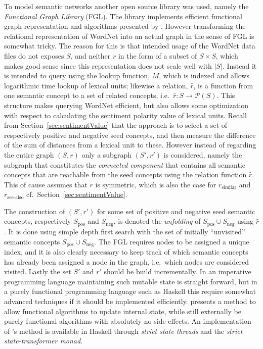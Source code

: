 To model semantic networks another open source library was used, namely the \emph{Functional Graph Library} (FGL). The library implements efficient functional graph representation and algorithms presented by \citeauthor{fgl} . However transforming the relational representation of WordNet into an actual graph in the sense of FGL is somewhat tricky. The reason for this is that intended usage of the WordNet data files do not exposes $S$, and neither $r$ in the form of a subset of $S \times S$, which makes good sense since this representation does not scale well with $|S|$. Instead it is intended to query using the lookup function, $M$, which is indexed and allows logarithmic time lookup of lexical units; likewise a relation, $\hat{r}$, is a function from one semantic concept to a set of related concepts, i.e.\ $\hat{r}: S \to \mathcal{P}(S)$. This structure makes querying WordNet efficient, but also allows some optimization with respect to calculating the sentiment polarity value of lexical units. Recall from Section~\ref{sec:sentimentValue} that the approach is to select a set of respectively positive and negative seed concepts, and then measure the difference of the sum of distances from a lexical unit to these. However instead of regarding the entire graph $(S, r)$ only a subgraph $(S', r')$ is considered, namely the subgraph that constitutes the \emph{connected component} that contains all semantic concepts that are reachable from the seed concepts using the relation function $\hat{r}$. This of cause assumes that $r$ is symmetric, which is also the case for $r_\mathrm{similar}$ and $r_\mathrm{see\text{-}also}$ cf.\ Section~\ref{sec:sentimentValue}.

The construction of $(S', r')$ for some set of positive and negative seed semantic concepts, respectively $S_\mathrm{pos}$ and $S_\mathrm{neg}$, is denoted the \emph{unfolding} of $S_\mathrm{pos} \cup S_\mathrm{neg}$ using $\hat{r}$. It is done using simple depth first search with the set of initially ``unvisited'' semantic concepts $S_\mathrm{pos} \cup S_\mathrm{neg}$. The FGL requires nodes to be assigned a unique index, and it is also clearly necessary to keep track of which semantic concepts has already been assigned a node in the graph, i.e.\ which nodes are considered visited. Lastly the set $S'$ and $r'$ should be build incrementally. In an imperative programming language maintaining such mutable state is straight forward, but in a purely functional programming language such as Haskell this require somewhat advanced techniques if it should be implemented efficiently. \citeauthor{st}  presents a method to allow functional algorithms to update internal state, while still externally be purely functional algorithms with absolutely no side-effects. An implementation of \citeauthor{st}'s method is available in Haskell through \emph{strict state threads} and the \emph{strict state-transformer monad}. 

